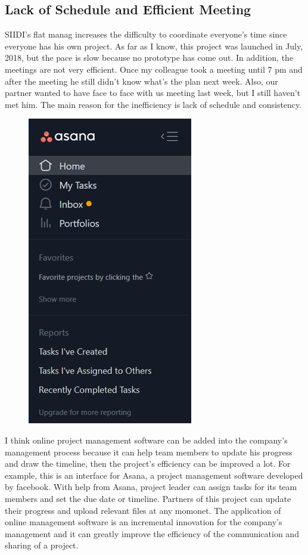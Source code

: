 \documentclass[12pt]{article}
\begin{document}
\subsection{Lack of Schedule and Efficient Meeting}
SIIDI's flat manag increases the difficulty to coordinate everyone's time since everyone has his own project. As far as I know, this project was launched in July, 2018, but the pace is slow because no prototype has come out. In addition, the meetings are not very efficient. Once my colleague took a meeting until 7 pm and after the meeting he still didn't know what's the plan next week. Also, our partner wanted to have face to face with us meeting last week, but I still haven't met him. The main reason for the inefficiency is lack of schedule and consistency.
\begin{figure}[H]
\centering
\includegraphics[scale=0.7]{p4.jpg}
\end{figure}
\par 
I think online project management software can be added into the company's management process because it can help team members to update his progress and draw the timeline, then the project's efficiency can be improved a lot. For example, this is an interface for Asana, a project management software developed by facebook. With help from Asana, project leader can assign tasks for its team members and set the due date or timeline. Partners of this project can update their progress and upload relevant files at any momonet. The application of online management software is an incremental innovation for the company's management and it can greatly improve the efficiency of the communication and sharing of a project.
\end{document}
